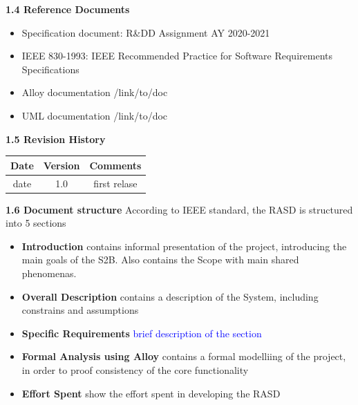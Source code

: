 \documentclass[a4paper, 10pt, oneside]{article}
\newcommand{\giovanni}[1]{\textcolor{Blue}{#1}}
\begin{document}
{\large \textbf{1.4 Reference Documents}}
\begin{itemize}
    \item Specification document: R\&DD Assignment AY 2020-2021
    \item IEEE 830-1993: IEEE Recommended Practice for Software Requirements Specifications
    \item Alloy documentation /link/to/doc
    \item UML documentation /link/to/doc
\end{itemize}
{\large \textbf{1.5 Revision History}}
\begin{center}
 \begin{tabular}{||c c c||}
 \hline
 Date & Version & Comments \\ [0.5ex] 
 \hline\hline
 date & 1.0 & first relase \\ 
 \hline
 \hline
\end{tabular}
\end{center}
{\large \textbf{1.6 Document structure}} \newline
\newline
According to IEEE standard, the RASD is structured into 5 sections
\begin{itemize}
    \item \textbf{Introduction} contains informal presentation of the project, introducing the main goals of the S2B. Also contains the Scope with main shared phenomenas.
    \item \textbf{Overall Description} contains a description of the System, including constrains and assumptions
    \item \textbf{Specific Requirements} \giovanni{brief description of the section}
    \item \textbf{Formal Analysis using Alloy} contains a formal modelliing of the project, in order to proof consistency of the core functionality 
    \item \textbf{Effort Spent} show the effort spent in developing the RASD
\end{itemize}
\end{document}
